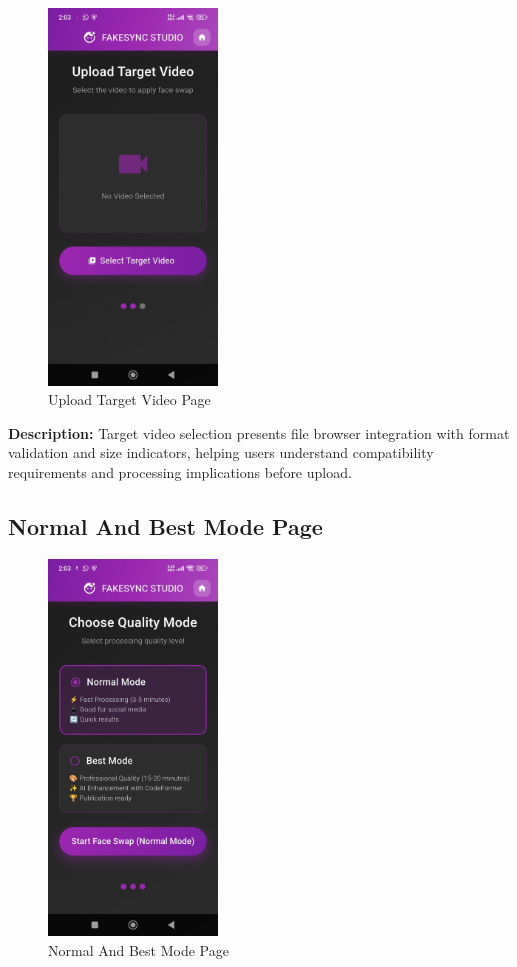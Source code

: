 \documentclass[12pt,a4paper]{report}
\begin{document}
\begin{figure}[H]
\centering
\includegraphics[width=0.4\textwidth]{figures/Target_Video.png}
\caption{Upload Target Video Page}
\label{fig:Upload_Target_Video_Page}
\end{figure}

\textbf{Description:} Target video selection presents file browser integration with format validation and size indicators, helping users understand compatibility requirements and processing implications before upload.

\subsection{Normal And Best Mode Page}

\begin{figure}[H]
\centering
\includegraphics[width=0.4\textwidth]{figures/normal.png}
\caption{Normal And Best Mode Page}
\label{fig:Normal_And_Best_Mode_Page}
\end{figure}
\end{document}
